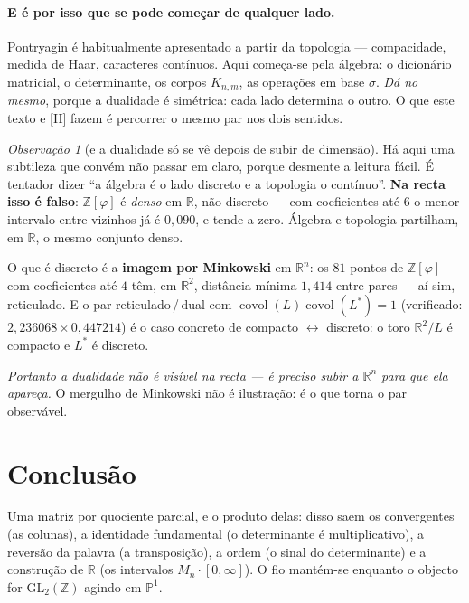 \documentclass[11pt,a4paper]{article}
\theoremstyle{plain}
\theoremstyle{definition}
\theoremstyle{remark}
\newtheorem{obs}[teorema]{Observação}
\newcommand{\R}{\mathbb{R}}
\newcommand{\Z}{\mathbb{Z}}
\newcommand{\Pj}{\mathbb{P}^1}
\newcommand{\GL}{\mathrm{GL}}
\begin{document}
\paragraph{E é por isso que se pode começar de qualquer lado.} Pontryagin é habitualmente
apresentado a partir da topologia --- compacidade, medida de Haar, caracteres contínuos. Aqui
começa-se pela álgebra: o dicionário matricial, o determinante, os corpos $K_{n,m}$, as operações
em base $\sigma$. \emph{Dá no mesmo}, porque a dualidade é simétrica: cada lado determina o outro.
O que este texto e [II] fazem é percorrer o mesmo par nos dois sentidos.

\begin{obs}[e a dualidade só se vê depois de subir de dimensão]\label{obs:densoDiscreto}
Há aqui uma subtileza que convém não passar em claro, porque desmente a leitura fácil. É tentador
dizer ``a álgebra é o lado discreto e a topologia o contínuo''. \textbf{Na recta isso é falso}:
$\Z[\varphi]$ é \emph{denso} em $\R$, não discreto --- com coeficientes até $6$ o menor intervalo
entre vizinhos já é $0{,}090$, e tende a zero. Álgebra e topologia partilham, em $\R$, o mesmo
conjunto denso.

O que é discreto é a \textbf{imagem por Minkowski} em $\R^n$: os $81$ pontos de $\Z[\varphi]$ com
coeficientes até $4$ têm, em $\R^2$, distância mínima $1{,}414$ entre pares --- aí sim, reticulado.
E o par reticulado\,/\,dual com $\operatorname{covol}(L)\operatorname{covol}(L^*) = 1$ (verificado:
$2{,}236068 \times 0{,}447214$) é o caso concreto de compacto $\leftrightarrow$ discreto: o toro
$\R^2/L$ é compacto e $L^*$ é discreto.

\emph{Portanto a dualidade não é visível na recta --- é preciso subir a $\R^n$ para que ela
apareça.} O mergulho de Minkowski não é ilustração: é o que torna o par observável.
\end{obs}

\section{Conclusão}\label{sec:conc}

Uma matriz por quociente parcial, e o produto delas: disso saem os convergentes (as colunas), a
identidade fundamental (o determinante é multiplicativo), a reversão da palavra (a transposição), a
ordem (o sinal do determinante) e a construção de $\R$ (os intervalos $M_n\cdot[0,\infty]$). O fio
mantém-se enquanto o objecto for $\GL_2(\Z)$ agindo em $\Pj$.
\end{document}
